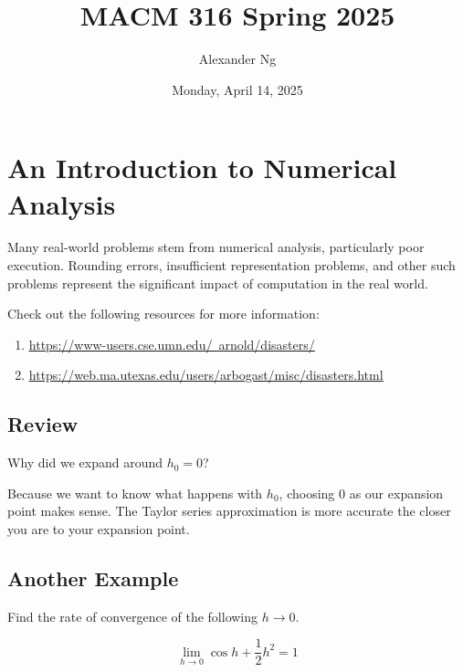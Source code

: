 \documentclass[12pt]{book}
\newcommand{\ulhref}[2]{\href{#1}{\color{blue}\uline{#2}}}
\begin{document}
\title{MACM 316 Spring 2025}
\author{Alexander Ng}
\date{Monday, April 14, 2025}

\maketitle

\tableofcontents
\clearpage

\chapter{An Introduction to Numerical Analysis}
Many real-world problems stem from numerical analysis, particularly poor 
execution. Rounding errors, insufficient representation problems, and other 
such problems represent the significant impact of computation in the real world.

Check out the following resources for more information:
\begin{enumerate}
  \item \ulhref{https://www-users.cse.umn.edu/~arnold/disasters/}{https://www-users.cse.umn.edu/~arnold/disasters/}
  \item \ulhref{https://web.ma.utexas.edu/users/arbogast/misc/disasters.html}{https://web.ma.utexas.edu/users/arbogast/misc/disasters.html}
\end{enumerate}





\section{Review}

Why did we expand around $h_0 = 0$?

\quad Because we want to know what happens with $h_0$, choosing $0$ as our 
expansion point makes sense. The Taylor series approximation is more accurate 
the closer you are to your expansion point.


\section{Another Example}

Find the rate of convergence of the following $h\to 0$.

\begin{equation*}
  \lim_{h \to 0} \cos h + \frac{1}{2} h^2 = 1
\end{equation*}
\end{document}
